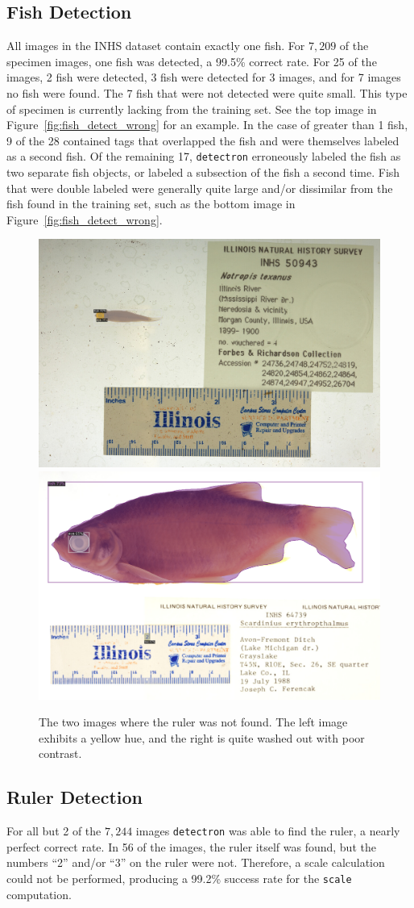 \documentclass[conference]{IEEEtran}
\begin{document}
\subsection{Fish Detection}
All images in the INHS dataset contain exactly one fish. For \(7,209\) of the specimen images, one fish was detected, a 99.5\% correct rate.
For 25 of the images, 2 fish were detected, 3 fish were detected for 3 images, and for 7 images no fish were found.
The 7 fish that were not detected were quite small. This type of specimen 
is currently lacking from the training set.
See the top image in Figure~\ref{fig:fish_detect_wrong} for an example.
In the case of greater than 1 fish, 9 of the 28 contained tags that
overlapped the fish and were themselves labeled as a second fish.
Of the remaining 17, \verb|detectron| erroneously labeled the fish as two separate fish objects, or labeled a subsection of the fish a second time.
Fish that were double labeled were generally quite large and/or dissimilar from the fish found in the training set, such as the bottom image in
Figure~\ref{fig:fish_detect_wrong}.

\begin{figure}[H]
  \centering
  \includegraphics[width=0.49\linewidth]{images/no_ruler1}
  \includegraphics[width=0.49\linewidth]{images/no_ruler2}
  \caption{The two images where the ruler was not found. The left image exhibits a yellow hue, and the right is quite washed out with poor contrast.}
  \label{fig:no_ruler}
\end{figure}


\subsection{Ruler Detection}
For all but 2 of the \(7,244\) images \verb|detectron| was able to find the ruler, a nearly perfect correct rate.
In 56 of the images, the ruler itself was found, but the numbers ``2''
and/or ``3'' on the ruler were not. Therefore, a scale calculation could
not be performed, producing a 99.2\% success rate for
the \verb|scale| computation.
\end{document}
